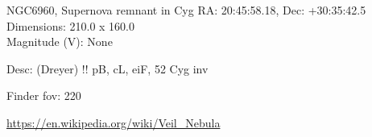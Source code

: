 \begin{block}{NGC6960, Supernova remnant in Cyg}
    RA: 20:45:58.18, Dec: +30:35:42.5 \\ 
    Dimensions: 210.0 x 160.0 \\ 
    Magnitude (V): None


    Desc: (Dreyer) !! pB, cL, eiF, 52 Cyg inv 

    Finder fov: 220 

    \url{https://en.wikipedia.org/wiki/Veil_Nebula} 
\end{block}